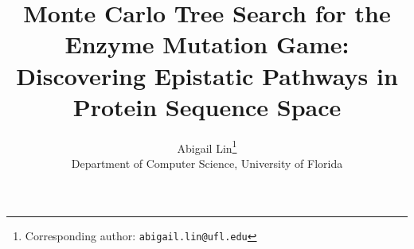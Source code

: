 \documentclass[11pt]{article}
\title{Monte Carlo Tree Search for the Enzyme Mutation Game: 
\\ Discovering Epistatic Pathways in Protein Sequence Space}
\author{
  Abigail Lin\thanks{Corresponding author: \texttt{abigail.lin@ufl.edu}} \\
  \normalsize Department of Computer Science, University of Florida}
\date{}
\newcommand{\ddG}{\Delta\Delta G}
\begin{document}
\maketitle

\begin{abstract}




\end{abstract}
\end{document}

